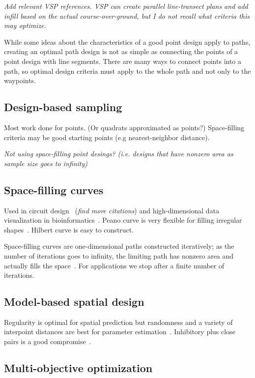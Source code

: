 \documentclass[review]{elsarticle}
\begin{document}
{\it Add relevant VSP references. VSP can create parallel line-transect plans
and add infill based on the actual course-over-ground, but I do not recall what
criteria this may optimize.}

While some ideas about the characteristics of a good point design apply to
paths, creating an optimal path design is not as simple as connecting the
points of a point design with line segments. There are many ways to connect
points into a path, so optimal design criteria must apply to the whole path and
not only to the waypoints.


\subsection{Design-based sampling}

Most work done for points. (Or quadrats approximated as points?) Space-filling
criteria may be good starting points (e.g nearest-neighbor distance).

{\it Not using space-filling point desings? (i.e. designs that have nonzero
area as sample size goes to infinity)}


\subsection{Space-filling curves}

Used in circuit design~\citep{fanetal} ({\it find more citations}) and
high-dimensional data visualization in bioinformatics~\citep{hilbertvis}.
Peano curve is very flexible for filling irregular shapes~\citep{fanetal}.
Hilbert curve is easy to construct.

Space-filling curves are one-dimensional paths constructed iteratively; as the
number of iterations goes to infinity, the limiting path has nonzero area and
actually fills the space~\citep{sagan}. For applications we stop after a finite
number of iterations.


\subsection{Model-based spatial design}

Regularity is optimal for spatial prediction but randomness and a variety of
interpoint distances are best for parameter estimation~\citep{diggle}.
Inhibitory plus close pairs is a good compromise~\citep{chipetaetal2017}.


\subsection{Multi-objective optimization}
\end{document}
